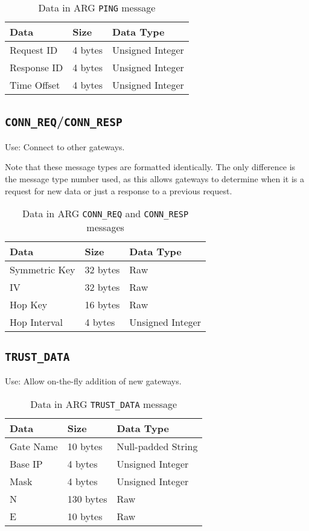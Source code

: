 \begin{table}[H]
\caption{Data in \ac{ARG} \texttt{PING} message}
\label{tbl:arg_ping_struct}
\centering
\begin{tabular}{l|l|l}
\textbf{Data} & \textbf{Size} & \textbf{Data Type}\\
\hline
Request ID & 4 bytes & Unsigned Integer\\
Response ID & 4 bytes & Unsigned Integer\\
Time Offset & 4 bytes & Unsigned Integer
\end{tabular}
\end{table}

\subsection{\texttt{CONN\_REQ}/\texttt{CONN\_RESP}}
\par Use: Connect to other gateways.

\par Note that these message types are formatted identically. The only difference is the message type number used, as this allows gateways to determine when it is a request for new data or just a response to a previous request.

\begin{table}[H]
\caption{Data in \ac{ARG} \texttt{CONN\_REQ} and \texttt{CONN\_RESP} messages}
\label{tbl:arg_conn_data_struct}
\centering
\begin{tabular}{l|l|l}
\textbf{Data} & \textbf{Size} & \textbf{Data Type}\\
\hline
Symmetric Key & 32 bytes & Raw\\
\ac{IV} & 32 bytes & Raw\\
Hop Key & 16 bytes & Raw\\
Hop Interval & 4 bytes & Unsigned Integer
\end{tabular}
\end{table}

\subsection{\texttt{TRUST\_DATA}}
\par Use: Allow on-the-fly addition of new gateways.

\begin{table}[H]
\caption{Data in \ac{ARG} \texttt{TRUST\_DATA} message}
\label{tbl:arg_trust_struct}
\centering
\begin{tabular}{l|l|l}
\textbf{Data} & \textbf{Size} & \textbf{Data Type}\\
\hline
Gate Name & 10 bytes & Null-padded String\\
Base \ac{IP} & 4 bytes & Unsigned Integer\\
Mask & 4 bytes & Unsigned Integer\\
N & 130 bytes & Raw\\
E & 10 bytes & Raw
\end{tabular}
\end{table}

